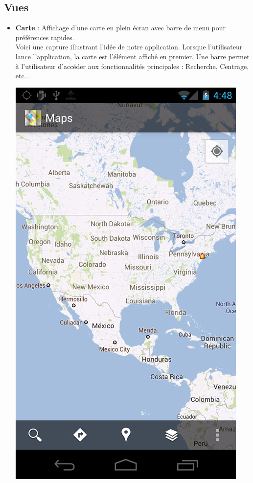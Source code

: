 \documentclass{article}
\begin{document}
	\subsection{Vues}
	\begin{itemize}
	\item \textbf{Carte} : Affichage d'une carte en plein écran avec barre de menu pour préférences rapides. \\
	Voici une capture illustrant l'idée de notre application. Lorsque l'utilisateur lance l'application, la carte est l'élément affiché en premier. Une barre permet à l'utilisateur d'accéder aux fonctionnalités principales :  Recherche, Centrage,  etc... \\
		\begin{center}
			\includegraphics[scale=0.35]{map.jpg}

\end{center}
\end{itemize}
\end{document}
